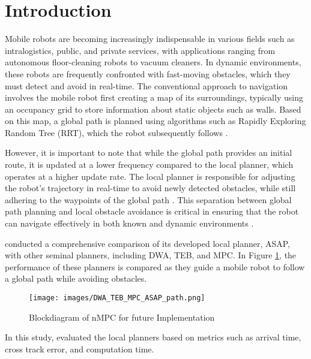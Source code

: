 \documentclass[conference]{IEEEtran}
\begin{document}
\section{Introduction}

Mobile robots are becoming increasingly indispensable in various fields such as intralogistics, public, and private services, with applications ranging from autonomous floor-cleaning robots to vacuum cleaners. In dynamic environments, these robots are frequently confronted with fast-moving obstacles, which they must detect and avoid in real-time. The conventional approach to navigation involves the mobile robot first creating a map of its surroundings, typically using an occupancy grid to store information about static objects such as walls. Based on this map, a global path is planned using algorithms such as Rapidly Exploring Random Tree (RRT), which the robot subsequently follows \cite{thrun2005probabilistic}.

However, it is important to note that while the global path provides an initial route, it is updated at a lower frequency compared to the local planner, which operates at a higher update rate. The local planner is responsible for adjusting the robot's trajectory in real-time to avoid newly detected obstacles, while still adhering to the waypoints of the global path \cite{siegwart2011autonomous}. This separation between global path planning and local obstacle avoidance is critical in ensuring that the robot can navigate effectively in both known and dynamic environments \cite{khatib1986real}.


\cite{ASAP} conducted a comprehensive comparison of its developed local planner, ASAP, with other seminal planners, including DWA, TEB, and MPC. In Figure \ref{fig:DWA_TEB_MPC_ASAP_path}, the performance of these planners is compared as they guide a mobile robot to follow a global path while avoiding obstacles. 

\begin{figure}[!h]
    \centering
    \texttt{[image: images/DWA\_TEB\_MPC\_ASAP\_path.png]}
    \caption{Blockdiagram of nMPC for future Implementation }
    \label{fig:DWA_TEB_MPC_ASAP_path}
\end{figure}

In this study, \cite{ASAP} evaluated the local planners based on metrics such as arrival time, cross track error, and computation time. 
\end{document}
